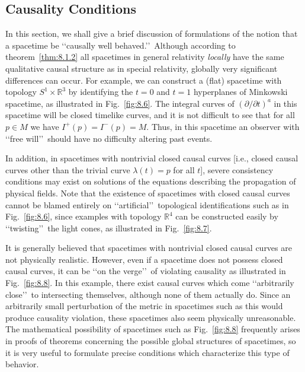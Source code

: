 
\subsection{Causality Conditions}\label{sec:8.2}
\setcounter{theorem}{0}

In this section, we shall give a brief discussion of formulations of the notion that
a spacetime be \lq\lq causally well behaved.\rq\rq\ Although according to
theorem~\ref{thm:8.1.2} all spacetimes in general relativity \emph{locally} have the
same qualitative causal structure as in special relativity, globally very significant
differences can occur. For example, we can construct a (flat) spacetime with topology
\(S^1\times\mathbb{R}^3\) by identifying the \(t=0\) and \(t=1\) hyperplanes of
Minkowski spacetime, as illustrated in Fig.~\ref{fig:8.6}. The integral curves of
\((\partial/\partial t)^a\) in this spacetime will be closed timelike curves, and it
is not difficult to see that for all \(p\in M\) we have \(I^+(p)=I^-(p)=M\). Thus,
in this spacetime an observer with \lq\lq free will\rq\rq\ should have no difficulty
altering past events.



In addition, in spacetimes with nontrivial closed causal curves [i.e., closed causal
curves other than the trivial curve \(\lambda(t)=p\) for all \(t\)], severe consistency
conditions may exist on solutions of the equations describing the propagation of
physical fields. Note that the existence of spacetimes with closed causal curves
cannot be blamed entirely on \lq\lq artificial\rq\rq\ topological identifications such as in
Fig.~\ref{fig:8.6}, since examples with topology \(\mathbb{R}^4\) can be constructed
easily by \lq\lq twisting\rq\rq\ the light cones, as illustrated in Fig.~\ref{fig:8.7}.



It is generally believed that spacetimes with nontrivial closed causal curves are not
physically realistic. However, even if a spacetime does not possess closed causal
curves, it can be \lq\lq on the verge\rq\rq\ of violating causality as illustrated in
Fig.~\ref{fig:8.8}. In this example, there exist causal curves which come
\lq\lq arbitrarily close\rq\rq\ to intersecting themselves, although none of them actually
do. Since an arbitrarily small perturbation of the metric in spacetimes such as this
would produce causality violation, these spacetimes also seem physically unreasonable.
The mathematical possibility of spacetimes such as Fig.~\ref{fig:8.8} frequently
arises in proofs of theorems concerning the possible global structures of spacetimes,
so it is very useful to formulate precise conditions which characterize this type of
behavior.

